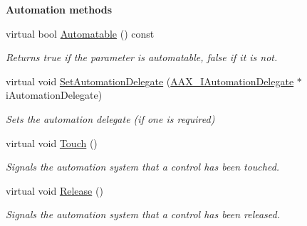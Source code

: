 \begin{Indent}{\bf Automation methods}\par
\begin{DoxyCompactItemize}
\item 
virtual bool \hyperlink{a00040_a8d8b6be98d4b28eca3fbacb4c316cd15}{Automatable} () const 
\begin{DoxyCompactList}\small\item\em Returns true if the parameter is automatable, false if it is not. \end{DoxyCompactList}\item 
virtual void \hyperlink{a00040_a6f81c5754c44fc9e2f76b61614f7d2e6}{Set\+Automation\+Delegate} (\hyperlink{a00086}{A\+A\+X\+\_\+\+I\+Automation\+Delegate} $\ast$i\+Automation\+Delegate)
\begin{DoxyCompactList}\small\item\em Sets the automation delegate (if one is required) \end{DoxyCompactList}\item 
virtual void \hyperlink{a00040_aacbd45b8f520ba3db30fbd70438eef8e}{Touch} ()
\begin{DoxyCompactList}\small\item\em Signals the automation system that a control has been touched. \end{DoxyCompactList}\item 
virtual void \hyperlink{a00040_a1a388fd682211b491bf61c3ca79b1816}{Release} ()
\begin{DoxyCompactList}\small\item\em Signals the automation system that a control has been released. \end{DoxyCompactList}\end{DoxyCompactItemize}
\end{Indent}
